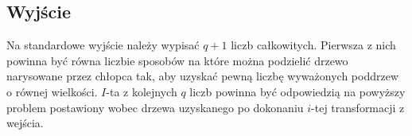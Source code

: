 \documentclass[zad,zawodnik,utf8]{sinol}
\begin{document}
\begin{tasktext}
  \section{Wyjście}
Na standardowe wyjście należy wypisać $q+1$ liczb całkowitych. Pierwsza z nich powinna być równa liczbie sposobów na które można podzielić drzewo
narysowane przez chłopca tak, aby uzyskać pewną liczbę wyważonych poddrzew o równej wielkości. $I$-ta z kolejnych $q$ liczb powinna być odpowiedzią
na powyższy problem postawiony wobec drzewa uzyskanego po dokonaniu $i$-tej transformacji z wejścia.
  
\makecompactexample

\end{tasktext}
\end{document}
